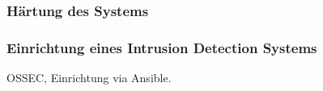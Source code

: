 \subsubsection{Härtung des Systems}


\subsubsection{Einrichtung eines Intrusion Detection Systems}

OSSEC, Einrichtung via Ansible.
